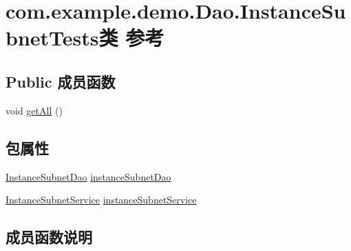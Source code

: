 \hypertarget{classcom_1_1example_1_1demo_1_1_dao_1_1_instance_subnet_tests}{}\section{com.\+example.\+demo.\+Dao.\+Instance\+Subnet\+Tests类 参考}
\label{classcom_1_1example_1_1demo_1_1_dao_1_1_instance_subnet_tests}
\subsection*{Public 成员函数}
\begin{DoxyCompactItemize}
\item 
void \mbox{\hyperlink{classcom_1_1example_1_1demo_1_1_dao_1_1_instance_subnet_tests_a3bd767d26e180280a999022b378017c9}{get\+All}} ()
\end{DoxyCompactItemize}
\subsection*{包属性}
\begin{DoxyCompactItemize}
\item 
\mbox{\hyperlink{interfacecom_1_1example_1_1demo_1_1dao_1_1_instance_subnet_dao}{Instance\+Subnet\+Dao}} \mbox{\hyperlink{classcom_1_1example_1_1demo_1_1_dao_1_1_instance_subnet_tests_a5daa3c9d07e973263792b2c55eb3f615}{instance\+Subnet\+Dao}}
\item 
\mbox{\hyperlink{classcom_1_1example_1_1demo_1_1service_1_1_instance_subnet_service}{Instance\+Subnet\+Service}} \mbox{\hyperlink{classcom_1_1example_1_1demo_1_1_dao_1_1_instance_subnet_tests_a39b3f44585262b211ea02f0f74adaec2}{instance\+Subnet\+Service}}
\end{DoxyCompactItemize}


\subsection{成员函数说明}
\mbox{\label{classcom_1_1example_1_1demo_1_1_dao_1_1_instance_subnet_tests_a3bd767d26e180280a999022b378017c9}} 

